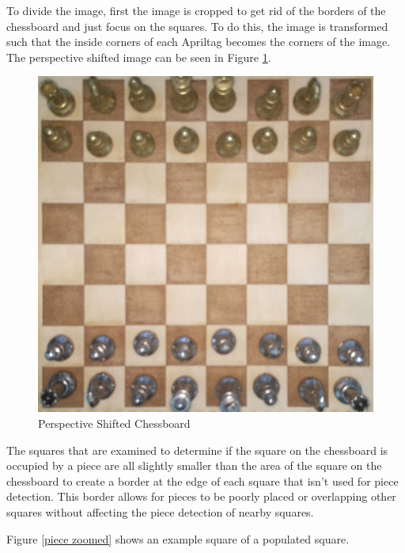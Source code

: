\documentclass[journal]{IEEEtran}
\begin{document}
To divide the image, first the image is cropped to get rid of the borders of the chessboard and just focus on the squares. To do this, the image is transformed such that the inside corners of each Apriltag becomes the corners of the image.
The perspective shifted image can be seen in Figure \ref{InsideCrop}.

\begin{figure}[!ht]
	\centering
	\includegraphics[width=\linewidth]{Images/InputImage_InsideCrop.jpg}
	\caption{Perspective Shifted Chessboard}
	\label{InsideCrop}
\end{figure}

The squares that are examined to determine if the square on the chessboard is occupied by a piece are all slightly smaller than the area of the square on the chessboard to create a border at the edge of each square that isn't used for piece detection. This border allows for pieces to be poorly placed or overlapping other squares without affecting the piece detection of nearby squares.

Figure \ref{piece zoomed} shows an example square of a populated square.
\end{document}
